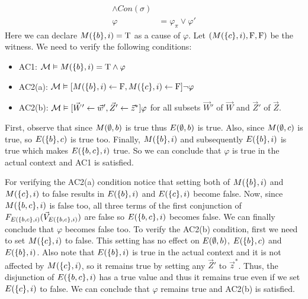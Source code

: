 \begin{example}
\begin{align*}
        \wedge Con(\sigma)                            \\
        \varphi       & = \varphi_{\pi} \vee \varphi'
    \end{align*}
    Here we can declare $M(\{b\},i) = \mathrm{T}$ as a cause of $\varphi$.
    Let $(M(\{c\},i),\mathrm{F},\mathrm{F})$ be the witness.
    We need to verify the following conditions:
    \begin{itemize}
        \item AC1:  $\mathcal{M} \vDash M(\{b\},i) = \mathrm{T} \wedge \varphi$
        \item AC2(a): $\mathcal{M}\vDash [M(\{b\},i)\leftarrow \mathrm{F},M(\{c\},i)\leftarrow \mathrm{F}] \neg \varphi$
        \item AC2(b): $\mathcal{M} \vDash [\vec W' \leftarrow \vec w', \vec Z' \leftarrow \vec z^* ]\varphi$
              for all subsets
              $\vec W'$ of $\vec W$ and $\vec Z'$ of $\vec Z$.
    \end{itemize}
    First, observe that since $M(\emptyset,b)$ is true thus $E(\emptyset,b)$ is true.
    Also, since $M(\emptyset,c)$ is true, so $E(\{b\},c)$ is true too.
    Finally, $M(\{b\},i)$ and subsequently $E(\{b\},i)$ is true which makes
    $E(\{b,c\},i)$ true.
    So we can conclude that $\varphi$ is true in the actual context and
    AC1 is satisfied.

    For verifying the AC2(a) condition notice that setting both of
    $M(\{b\},i)$ and $M(\{c\},i)$ to false results in
    $E(\{b\},i)$ and $E(\{c\},i)$ become false.
    Now, since $M(\{b,c\},i)$ is false too, all three terms of the first
    conjunction of $F_{E(\{b,c\},i)}(\vec V_{E(\{b,c\},i)})$ are false so $E(\{b,c\},i)$ becomes false.
    We can finally conclude that $\varphi$ becomes false too.
    To verify the AC2(b) condition, first we need to set $M(\{c\},i)$ to false.
    This setting has no effect on $E(\emptyset,b)$, $E(\{b\},c)$ and $E(\{b\},i)$.
    Also note that $E(\{b\},i)$ is true in the actual context and it is
    not affected by $M(\{c\},i)$, so it remains true by setting
    any $\vec Z'$ to $\vec z^*$.
    Thus, the disjunction of $E(\{b,c\},i)$ has a true value and thus it
    remains true even if we set $E(\{c\},i)$ to false.
    We can conclude that $\varphi$ remains true and AC2(b) is satisfied.
\end{example}